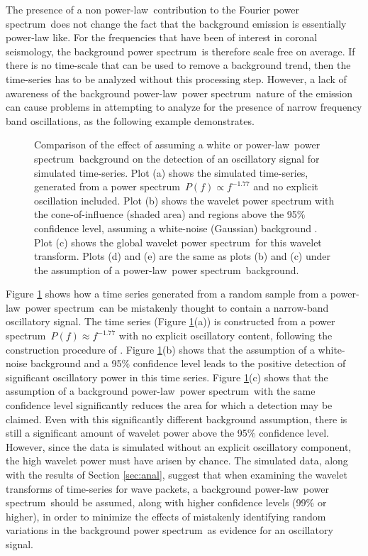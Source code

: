 \documentclass[onecolumn]{emulateapj}
\newcommand{\PS}{power spectrum}
\newcommand{\PL}{power-law}
\newcommand{\Fps}{Fourier \PS}
\begin{document}
The presence of a non \PL\ contribution to the \Fps\ does not change
the fact that the background emission is essentially power-law like.
For the frequencies that have been of interest in coronal seismology,
the background \PS\ is therefore scale free on average.  If there is
no time-scale that can be used to remove a background trend, then the
time-series has to be analyzed without this processing step.  However,
a lack of awareness of the background \PL\ \PS\ nature of the emission
can cause problems in attempting to analyze for the presence of narrow
frequency band oscillations, as the following example demonstrates.

\begin{figure}
\caption{Comparison of the effect of assuming a white or
  \PL\ \PS\ background on the detection of an oscillatory signal for
  simulated time-series.  Plot (a) shows the simulated time-series,
  generated from a \protect\PS\ \protect$P(f)\propto f^{-1.77}$ and no
  explicit oscillation included.  Plot (b) shows the wavelet power
  spectrum with the cone-of-influence (shaded area) and regions above
  the 95\% confidence level, assuming a white-noise (Gaussian)
  background .  Plot (c) shows the global wavelet \protect\PS\ for
  this wavelet transform.  Plots (d) and (e) are the same as plots (b)
  and (c) under the assumption of a
  \protect\PL\ \protect\PS\ background.}
\label{fig:comparison}
\end{figure}

Figure \ref{fig:comparison} shows how a time series generated from a
random sample from a \PL\ \PS\ can be mistakenly thought to contain a
narrow-band oscillatory signal.  The time series (Figure
\ref{fig:comparison}(a)) is constructed from a \PS\ $P(f)\approx
f^{-1.77}$ with no explicit oscillatory content, following the
construction procedure of \cite{2010MNRAS.402..307V}.  Figure
\ref{fig:comparison}(b) shows that the assumption of a white-noise
background and a 95\% confidence level leads to the positive detection
of significant oscillatory power in this time series. Figure
\ref{fig:comparison}(c) shows that the assumption of a background
\PL\ \PS\ with the same confidence level significantly reduces the
area for which a detection may be claimed.  Even with this
significantly different background assumption, there is still a
significant amount of wavelet power above the 95\% confidence level.
However, since the data is simulated without an explicit oscillatory
component, the high wavelet power must have arisen by chance.  The
simulated data, along with the results of Section \ref{sec:anal},
suggest that when examining the wavelet transforms of time-series for
wave packets, a background \PL\ \PS\ should be assumed, along with
higher confidence levels (99\% or higher), in order to minimize the
effects of mistakenly identifying random variations in the background
\PS\ as evidence for an oscillatory signal.
\end{document}
